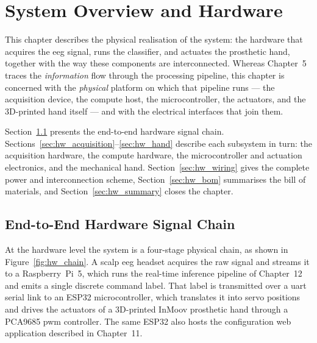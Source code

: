 \chapter{System Overview and Hardware}
\label{ch:hardware}

This chapter describes the physical realisation of the system: the
hardware that acquires the \acrshort{eeg} signal, runs the
classifier, and actuates the prosthetic hand, together with the way
these components are interconnected. Whereas Chapter~5 traces the
\emph{information} flow through the processing pipeline, this
chapter is concerned with the \emph{physical} platform on which that
pipeline runs --- the acquisition device, the compute host, the
microcontroller, the actuators, and the 3D-printed hand itself ---
and with the electrical interfaces that join them.

Section~\ref{sec:hw_overview} presents the end-to-end hardware
signal chain. Sections~\ref{sec:hw_acquisition}--\ref{sec:hw_hand}
describe each subsystem in turn: the acquisition hardware, the
compute hardware, the microcontroller and actuation electronics, and
the mechanical hand. Section~\ref{sec:hw_wiring} gives the complete
power and interconnection scheme, Section~\ref{sec:hw_bom}
summarises the bill of materials, and
Section~\ref{sec:hw_summary} closes the chapter.

\section{End-to-End Hardware Signal Chain}
\label{sec:hw_overview}

At the hardware level the system is a four-stage physical chain, as
shown in Figure~\ref{fig:hw_chain}. A scalp \acrshort{eeg} headset
acquires the raw signal and streams it to a Raspberry~Pi~5, which
runs the real-time inference pipeline of Chapter~12 and emits a
single discrete command label. That label is transmitted over a
\acrshort{uart} serial link to an ESP32 microcontroller, which
translates it into servo positions and drives the actuators of a
3D-printed InMoov prosthetic hand through a PCA9685 \acrshort{pwm}
controller. The same ESP32 also hosts the configuration web
application described in Chapter~11.

